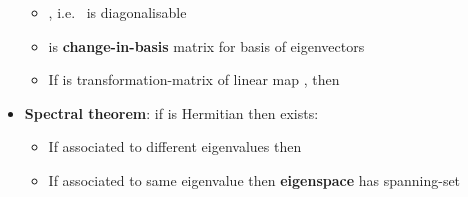\begin{itemize}
            \begin{itemize}

                  \item
                        , i.e.~ is diagonalisable
                  \item
                         is \textbf{change-in-basis} matrix for
                        basis
                         of
                        eigenvectors
                  \item
                        If  is transformation-matrix of linear
                        map , then
            \end{itemize}
      \item
            \textbf{Spectral theorem}: if  is Hermitian then
             exists:

            \begin{itemize}

                  \item
                        If  associated to different
                        eigenvalues then 
                  \item
                        If associated to same eigenvalue \iMbox{\lambda} then
                        \textbf{eigenspace}  has spanning-set

                        \begin{itemize}


\end{itemize}
\end{itemize}
\end{itemize}
